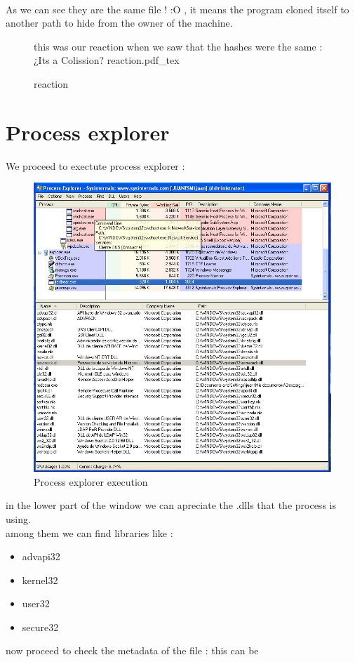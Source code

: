 \documentclass[10pt,a4paper]{article} %
\newcommand{\incfig}[1]{%
    \def\svgwidth{\columnwidth}
    {#1.pdf_tex}
}
\begin{document}
        \\ As we can see they are the same file !  :O , it means the program
        cloned itself to another path to hide from the owner of the machine.
            \begin{figure}[h!]
                \centering
                \color{blue}
                this was our reaction when we saw that the hashes were the same : ¿Its  a Colission?
                \color{black}
                \incfig{reaction}
                \caption{reaction}
                \label{fig:reaction}
            \end{figure}
        \newpage
        \section{Process explorer}
            We proceed to exectute process explorer :
            \begin{figure}[h!]
                \centering
                \includegraphics[width=0.6\linewidth]{fig9.jpeg}
                \caption{Process explorer execution}
                \label{9}
            \end{figure}
            in the lower part of the window we can apreciate the .dlls that the process is using.
            \\ among them we can find libraries like :
            \begin{itemize}
                \item {advapi32}
                \item {kernel32}
                \item {user32}
                \item {secure32}
            \end{itemize}
            now proceed to check the metadata of the file : this can be
\end{document}
